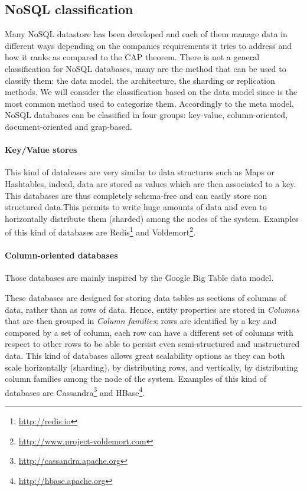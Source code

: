 \subsection{NoSQL classification}
Many NoSQL datastore has been developed and each of them manage data in different ways depending on the companies requirements it tries to address and how it ranks as compared to the CAP theorem.
There is not a general classification for NoSQL databases, many are the method that can be used to classify them: the data model, the architecture, the sharding or replication methods. We will consider the classification based on the data model since is the most common method used to categorize them.
Accordingly to the meta model, NoSQL databases can be classified in four groups: key-value, column-oriented, document-oriented and grap-based.

\paragraph{Key/Value stores} 
This kind of databases are very similar to data structures such as Maps or Hashtables, indeed, data are stored as values which are then associated to a key. This databases are thus completely schema-free and can easily store non structured data.This permits to write huge amounts of data and even to horizontally distribute them (sharded) among the nodes of the system.
Examples of this kind of databases are Redis\footnote{\url{http://redis.io}} and Voldemort\footnote{\url{http://www.project-voldemort.com}}.

\paragraph{Column-oriented databases}
Those databases are mainly inspired by the Google Big Table \cite{paper:bigtable} data model.

\noindent These databases are designed for storing data tables as sections of columns of data, rather than as rows of data. Hence, entity properties are stored in \textit{Columns} that are then grouped in \textit{Column families}; rows are identified by a key and composed by a set of column, each row can have a different set of columns with respect to other rows to be able to persist even semi-structured and unstructured data.
This kind of databases allows great scalability options as they can both scale horizontally (sharding), by distributing rows, and vertically, by distributing column families among the node of the system.
\noindent Examples of this kind of databases are Cassandra\footnote{\url{http://cassandra.apache.org}} and HBase\footnote{\url{http://hbase.apache.org}}.

